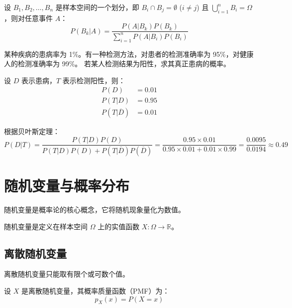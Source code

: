 \begin{theorem}[贝叶斯定理]\label{thm:bayes-theorem}
设 $B_1, B_2, \ldots, B_n$ 是样本空间的一个划分，即 $B_i \cap B_j = \emptyset$ ($i \neq j$) 且 $\bigcup_{i=1}^n B_i = \Omega$，则对任意事件 $A$：
\[
P(B_k|A) = \frac{P(A|B_k)P(B_k)}{\sum_{i=1}^n P(A|B_i)P(B_i)}
\]
\end{theorem}

\begin{examplebox}[title=医学诊断问题]
某种疾病的患病率为 1\%。有一种检测方法，对患者的检测准确率为 95\%，对健康人的检测准确率为 99\%。
若某人检测结果为阳性，求其真正患病的概率。

设 $D$ 表示患病，$T$ 表示检测阳性，则：
\begin{align}
P(D) &= 0.01 \\
P(T|D) &= 0.95 \\
P(T|\overline{D}) &= 0.01
\end{align}

根据贝叶斯定理：
\[
P(D|T) = \frac{P(T|D)P(D)}{P(T|D)P(D) + P(T|\overline{D})P(\overline{D})} = \frac{0.95 \times 0.01}{0.95 \times 0.01 + 0.01 \times 0.99} = \frac{0.0095}{0.0194} \approx 0.49
\]
\end{examplebox}

\section{随机变量与概率分布}\label{sec:random-variables}

随机变量是概率论的核心概念，它将随机现象量化为数值。

\begin{definition}[随机变量]\label{def:random-variable}
随机变量是定义在样本空间 $\Omega$ 上的实值函数 $X: \Omega \to \mathbb{R}$。
\end{definition}

\subsection{离散随机变量}

离散随机变量只能取有限个或可数个值。

\begin{definition}[概率质量函数]\label{def:pmf}
设 $X$ 是离散随机变量，其概率质量函数（PMF）为：
\[
p_X(x) = P(X = x)
\]
\end{definition}

